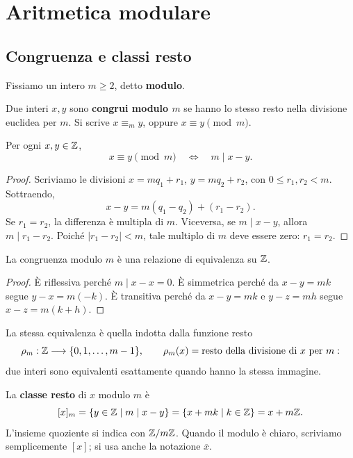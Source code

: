 \chapter{Aritmetica modulare}\label{cap:modulare}

\section{Congruenza e classi resto}
Fissiamo un intero $m\ge2$, detto \textbf{modulo}.
\begin{definizione}
Due interi $x,y$ sono \textbf{congrui modulo $m$} se hanno lo stesso resto nella divisione euclidea per $m$. Si scrive $x\equiv_m y$, oppure $x\equiv y\pmod m$.
\end{definizione}

\begin{proposizione}\label{prop:congruenza-divisibilita}
Per ogni $x,y\in\mathbb{Z}$,
\[
x\equiv y\pmod m\quad\Longleftrightarrow\quad m\mid x-y.
\]
\end{proposizione}
\begin{proof}
Scriviamo le divisioni $x=mq_1+r_1$, $y=mq_2+r_2$, con $0\le r_1,r_2<m$. Sottraendo,
\[
x-y=m(q_1-q_2)+(r_1-r_2).
\]
Se $r_1=r_2$, la differenza è multipla di $m$. Viceversa, se $m\mid x-y$, allora $m\mid r_1-r_2$. Poiché $|r_1-r_2|<m$, tale multiplo di $m$ deve essere zero: $r_1=r_2$.
\end{proof}

\begin{proposizione}
La congruenza modulo $m$ è una relazione di equivalenza su $\mathbb{Z}$.
\end{proposizione}
\begin{proof}
È riflessiva perché $m\mid x-x=0$. È simmetrica perché da $x-y=mk$ segue $y-x=m(-k)$. È transitiva perché da $x-y=mk$ e $y-z=mh$ segue $x-z=m(k+h)$.
\end{proof}

La stessa equivalenza è quella indotta dalla funzione resto
\[
\rho_m:\mathbb{Z}\longrightarrow\{0,1,\ldots,m-1\},\qquad
\rho_m(x)=\text{resto della divisione di $x$ per $m$}:
\]
due interi sono equivalenti esattamente quando hanno la stessa immagine.

\begin{definizione}
La \textbf{classe resto} di $x$ modulo $m$ è
\[
[x]_m=\{y\in\mathbb{Z}\mid m\mid x-y\}
     =\{x+mk\mid k\in\mathbb{Z}\}=x+m\mathbb{Z}.
\]
L'insieme quoziente si indica con $\mathbb{Z}/m\mathbb{Z}$. Quando il modulo è chiaro, scriviamo semplicemente $[x]$; si usa anche la notazione $\overline{x}$.
\end{definizione}

